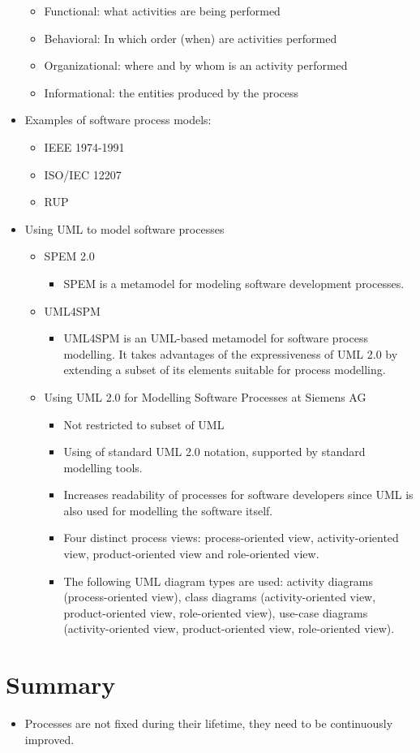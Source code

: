 \begin{itemize}
\begin{itemize}
		\item Functional: what activities are being performed
		\item Behavioral: In which order (when) are activities performed
		\item Organizational: where and by whom is an activity performed
		\item Informational: the entities produced by the process
	\end{itemize}
	\item Examples of software process models:
	\begin{itemize}
		\item IEEE 1974-1991
		\item ISO/IEC 12207
		\item \acf{RUP}
	\end{itemize}
	\item Using UML to model software processes
	\begin{itemize}
		\item \ac{SPEM} 2.0 \citep{Group:2008aa}
		\begin{itemize}
			\item \ac{SPEM} is a metamodel for modeling software development processes.
		\end{itemize}
		\item \ac{UML4SPM} \citep{Bendraou:2005dv}
		\begin{itemize}
			\item \ac{UML4SPM} is an \ac{UML}-based metamodel for software process modelling. It takes advantages of the expressiveness of \ac{UML} 2.0 by extending a subset of its elements suitable for process modelling.
		\end{itemize}
		\item Using UML 2.0 for Modelling Software Processes at Siemens AG \citep{Dietrich:2013aa}
		\begin{itemize}
			\item Not restricted to subset of UML
			\item Using of standard UML 2.0 notation, supported by standard modelling tools.
			\item Increases readability of processes for software developers since UML is also used for modelling the software itself.
			\item Four distinct process views: process-oriented view, activity-oriented view, product-oriented view and role-oriented view.
			\item The following UML diagram types are used: activity diagrams (process-oriented view), class diagrams (activity-oriented view, product-oriented view, role-oriented view), use-case diagrams (activity-oriented view, product-oriented view, role-oriented view).
		\end{itemize}
	\end{itemize}
\end{itemize}

\section{Summary}
\label{sec:ch6_summary}
\begin{itemize}
	\item Processes are not fixed during their lifetime, they need to be continuously improved. \citep{Fuggetta:2000ds}
\end{itemize}
